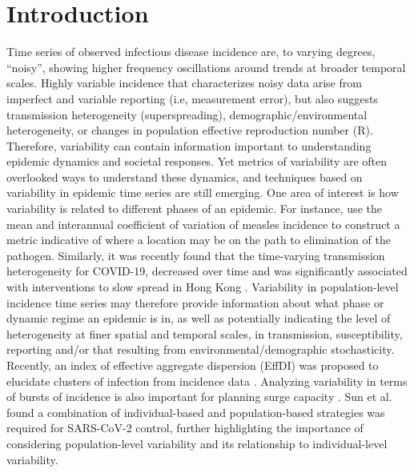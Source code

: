 \documentclass[10pt,letterpaper]{article}
\begin{document}
\linenumbers

\section*{Introduction}
Time series of observed infectious disease incidence are, to varying degrees, ``noisy'', showing higher frequency oscillations around trends at broader temporal scales.
Highly variable incidence that characterizes noisy data arise from imperfect and variable reporting (i.e, measurement error), but also suggests transmission heterogeneity (superspreading), demographic/environmental heterogeneity, or changes in population effective reproduction number (R).
Therefore, variability can contain information important to understanding epidemic dynamics and societal responses. 
Yet metrics of variability are often overlooked ways to understand these dynamics, and techniques based on variability in epidemic time series are still emerging. 
One area of interest is how variability is related to different phases of an epidemic. 
For instance, \cite{graham_measles_2019} use the mean and interannual coefficient of variation of measles incidence to construct a metric indicative of where a location may be on the path to elimination of the pathogen. 
Similarly, it was recently found that the time-varying transmission heterogeneity for COVID-19, decreased over time and was significantly associated with interventions to slow spread in Hong Kong \cite{adam_time-varying_2022}. 
Variability in population-level incidence time series may therefore provide information about what phase or dynamic regime an epidemic is in, as well as potentially indicating the level of heterogeneity at finer spatial and temporal scales, in transmission, susceptibility, reporting and/or that resulting from environmental/demographic stochasticity. 
Recently, an index of effective aggregate dispersion (EffDI) was proposed to elucidate clusters of infection from incidence data \cite{schneckenreither_assessing_2023}. 
Analyzing variability in terms of bursts of incidence is also important for planning surge capacity \cite{wallinga_metropolitan_2018}. 
Sun et al. \cite{sun_transmission_2021} found a combination of individual-based and population-based strategies was required for SARS-CoV-2 control, further highlighting the importance of considering population-level variability and its relationship to individual-level variability.
\end{document}
